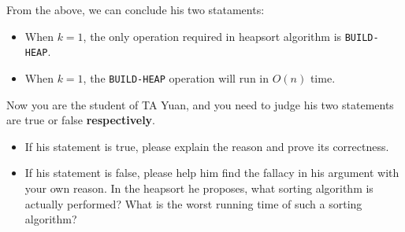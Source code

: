 \documentclass{article}
\begin{document}
From the above, we can conclude his two stataments:
\begin{itemize}
	\item{When $k=1$, the only operation required in heapsort algorithm is \texttt{BUILD-HEAP}.}
	\item{When $k=1$, the \texttt{BUILD-HEAP} operation will run in $O(n)$ time.}
\end{itemize}
Now you are the student of TA Yuan, and you need to judge his two statements are true or false \textbf{respectively}. 
\begin{itemize}
	\item{If his statement is true, please explain the reason and prove its correctness.}
	\item{If his statement is false, please help him find the fallacy in his argument with your own reason. In the heapsort he proposes, what sorting algorithm is actually performed? What is the worst running time of such a sorting algorithm?}
\end{itemize}



























\end{document}
